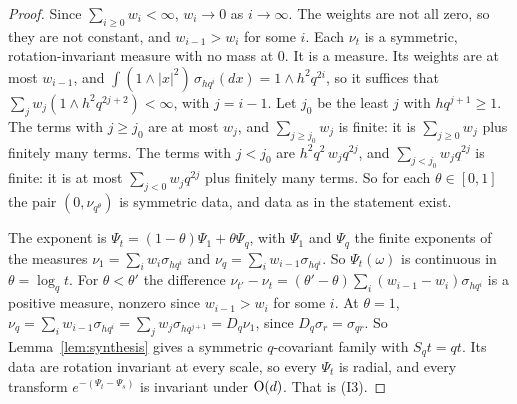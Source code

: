 \begin{proof}
\leanok
{}
Since $\sum_{i \ge 0}w_i < \infty$, $w_i \to 0$ as $i \to \infty$. The weights are not all zero, so
they are not constant, and $w_{i-1} > w_i$ for some $i$. Each $\nu_t$ is a symmetric,
rotation-invariant measure with no mass at $0$. It is a \Levy{} measure. Its weights are at most
$w_{i-1}$, and $\int(1 \wedge |x|^2)\,\sigma_{hq^i}(dx) = 1 \wedge h^2q^{2i}$, so it suffices that
$\sum_jw_j(1 \wedge h^2q^{2j+2}) < \infty$, with $j = i - 1$. Let $j_0$ be the least $j$ with
$hq^{j+1} \ge 1$. The terms with $j \ge j_0$ are at most $w_j$, and
$\sum_{j \ge j_0}w_j$ is finite: it is $\sum_{j \ge 0}w_j$ plus finitely many terms. The terms with
$j < j_0$ are $h^2q^2\,w_jq^{2j}$, and $\sum_{j < j_0}w_jq^{2j}$ is finite: it is at most
$\sum_{j<0}w_jq^{2j}$ plus finitely many terms. So for each $\theta \in [0, 1]$ the pair
$(0, \nu_{q^\theta})$ is symmetric \Levy{} data, and data as in the statement exist.

The exponent is $\Psi_t = (1 - \theta)\Psi_1 + \theta\Psi_q$, with $\Psi_1$ and $\Psi_q$ the finite
exponents of the \Levy{} measures $\nu_1 = \sum_iw_i\sigma_{hq^i}$ and
$\nu_q = \sum_iw_{i-1}\sigma_{hq^i}$. So
$\Psi_t(\omega)$ is continuous in $\theta = \log_qt$. For $\theta < \theta'$ the difference
$\nu_{t'} - \nu_t = (\theta' - \theta)\sum_i(w_{i-1} - w_i)\sigma_{hq^i}$ is a positive measure,
nonzero since $w_{i-1} > w_i$ for some $i$. At $\theta = 1$,
$\nu_q = \sum_iw_{i-1}\sigma_{hq^i} = \sum_jw_j\sigma_{hq^{j+1}} = D_q\nu_1$, since
$D_q\sigma_r = \sigma_{qr}$. So Lemma~\ref{lem:synthesis} gives a symmetric $q$-covariant family with
$S_qt = qt$. Its data are rotation invariant at every scale, so every $\Psi_t$ is radial, and every
transform $e^{-(\Psi_t - \Psi_s)}$ is invariant under $\mathrm{O}(d)$. That is (I3).


\end{proof}
